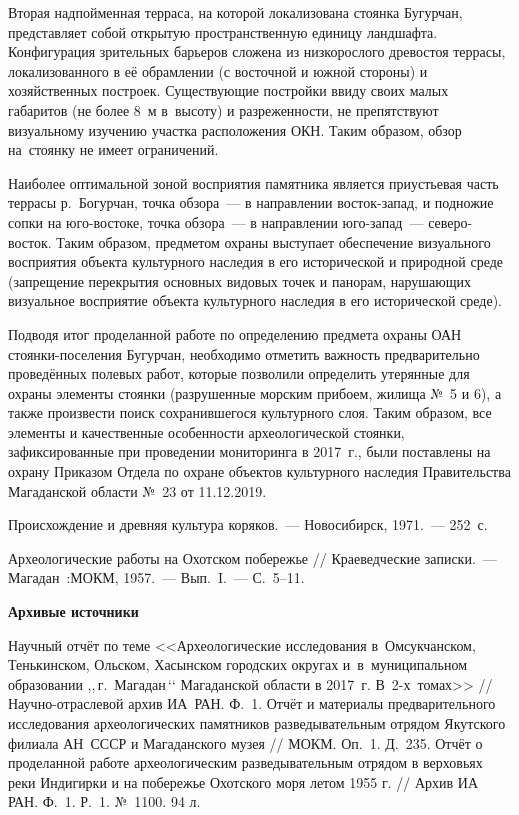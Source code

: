 Вторая надпойменная терраса, на которой локализована стоянка Бугурчан, представляет собой открытую пространственную единицу ландшафта. Конфигурация зрительных барьеров сложена из низкорослого древостоя террасы, локализованного в её обрамлении (с восточной и южной стороны) и хозяйственных построек. Существующие постройки ввиду своих малых габаритов (не более 8~м в~высоту) и разреженности, не препятствуют визуальному изучению участка расположения ОКН. Таким образом, обзор на~стоянку не имеет ограничений.

Наиболее оптимальной зоной восприятия памятника является приустьевая часть террасы р.~Богурчан, точка обзора~--- в направлении восток-запад, и подножие сопки на юго-востоке, точка обзора~--- в направлении юго-запад~--- северо-восток. Таким образом, предметом охраны выступает обеспечение визуального восприятия объекта культурного наследия в его исторической и природной среде (запрещение перекрытия основных видовых точек и панорам, нарушающих визуальное восприятие объекта культурного наследия в его исторической среде).

Подводя итог проделанной работе по определению предмета охраны ОАН стоянки-поселения Бугурчан, необходимо отметить важность предварительно проведённых полевых работ, которые позволили определить утерянные для охраны элементы стоянки (разрушенные морским прибоем, жилища №~5 и 6), а также произвести поиск сохранившегося культурного слоя. Таким образом, все элементы и качественные особенности археологической стоянки, зафиксированные при проведении мониторинга в 2017~г., были поставлены на охрану Приказом Отдела по охране объектов культурного наследия Правительства Магаданской области №~23 от 11.12.2019.

\begin{thebibliography}{99}

\bibitem{} Происхождение и древняя культура коряков.~--- Новосибирск, 1971.~--- 252~с.

\bibitem{} Археологические работы на Охотском побережье //  Краеведческие записки.~--- Магадан~:МОКМ, 1957.~--- Вып.~I.~--- С.~5--11.

\textbf{Архивые источники}

\bibitem{} Научный отчёт по теме <<Археологические исследования в~Омсукчанском, Тенькинском, Ольском, Хасынском городских округах и~в~муниципальном образовании ,,\,г.~Магадан\,‘‘ Магаданской области в 2017~г. В~2-х~томах>> // Научно-отраслевой архив ИА~РАН. Ф.~1.
\bibitem{} Отчёт и материалы предварительного исследования археологических памятников разведывательным отрядом Якутского филиала АН~СССР и Магаданского музея // МОКМ. Оп.~1. Д.~235.
\bibitem{} Отчёт о проделанной работе археологическим разведывательным отрядом в верховьях реки Индигирки и на побережье Охотского моря летом 1955 г. // Архив ИА РАН. Ф.~1. Р.~1. №~1100. 94 л.



\end{thebibliography}
